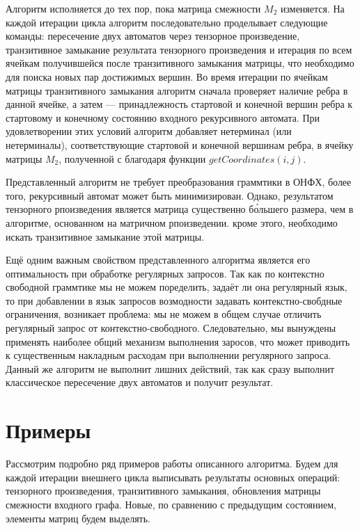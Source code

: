 Алгоритм исполняется до тех пор, пока матрица смежности $M_2$ изменяется. 
На каждой итерации цикла алгоритм последовательно проделывает следующие команды: пересечение двух автоматов через тензорное произведение, транзитивное замыкание результата тензорного произведения и итерация по всем ячейкам получившейся после транзитивного замыкания матрицы, что необходимо для поиска новых пар достижимых вершин.
Во время итерации по ячейкам матрицы транзитивного замыкания алгоритм сначала проверяет наличие ребра в данной ячейке, а затем --- принадлежность стартовой и конечной вершин ребра к стартовому и конечному состоянию входного рекурсивного автомата. 
При удовлетворении этих условий алгоритм добавляет нетерминал (или нетерминалы), соответствующие стартовой и конечной вершинам ребра, в ячейку матрицы $M_2$, полученной с благодаря функции $getCoordinates(i,j)$.

Представленный алгоритм не требует преобразования граммтики в ОНФХ, более того, рекурсивный автомат может быть минимизирован. Однако, результатом тензорного рпоизведения является матрица существенно б\'{о}льшего размера, чем в алгоритме, основанном на матричном рпоизведении. кроме этого, необходимо искать транзитивное замыкание этой матрицы.

Ещё одним важным свойством представленного алгоритма является его оптимальность при обработке регулярных запросов. Так как по контекстно свободной граммтике мы не можем поределить, задаёт ли она регулярный язык, то при добавлении в язык запросов возмодности задавать контекстно-свобдные ограничения, возникает проблема: мы не можем в общем случае отличить регулярный запрос от контекстно-свободного. Следовательно, мы вынуждены применять наиболее общий механизм выполнения заросов, что может приводить к существенным накладным расходам при выполнении регулярного запроса. Данный же алгоритм не выполнит лишних действий, так как сразу выполнит классическое пересечение двух автоматов и получит результат. 

\section{Примеры}

Рассмотрим подробно ряд примеров работы описанного алгоритма. 
Будем для каждой итерации внешнего цикла выписывать результаты основных операций: тензорного произведения, транзитивного замыкания, обновления матрицы смежности входного графа.
Новые, по сравнению с предыдущим состоянием, элементы матриц будем выделять.

